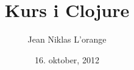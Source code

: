 \documentclass{beamer}
\title[Introduksjonskurs til programmeringsspråket Clojure]{Kurs i Clojure}
\author{Jean Niklas L'orange}
\date{16. oktober, 2012}
\begin{document}
\begin{frame}
  \titlepage
\end{frame}
\end{document}
